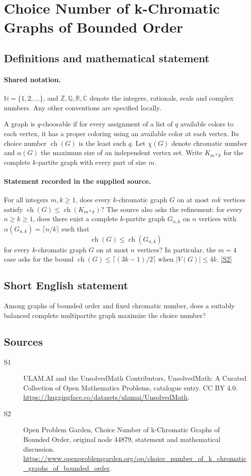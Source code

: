 \documentclass[11pt]{article}
\newcommand{\sref}[2]{\hyperlink{source:#1:#2}{[S#2]}}
\begin{document}
\section{Choice Number of k-Chromatic Graphs of Bounded Order}\label{statement}

\subsection{Definitions and mathematical statement}

\paragraph{Shared notation.}$\mathbb N=\{1,2,\ldots\}$, and $\mathbb Z,\mathbb Q,\mathbb R,\mathbb C$ denote the integers, rationals, reals and complex numbers. Any other conventions are specified locally.


A graph is $q$-choosable if for every assignment of a list of $q$ available colors to each vertex, it has a proper coloring using an available color at each vertex. Its choice number $\operatorname{ch}(G)$ is the least such $q$. Let $\chi(G)$ denote chromatic number and $\alpha(G)$ the maximum size of an independent vertex set. Write $K_{m*k}$ for the complete $k$-partite graph with every part of size $m$.
\paragraph{Statement recorded in the supplied source.}
For all integers $m,k\ge1$, does every $k$-chromatic graph $G$ on at most $mk$ vertices satisfy $\operatorname{ch}(G)\le\operatorname{ch}(K_{m*k})$? The source also asks the refinement: for every $n\ge k\ge1$, does there exist a complete $k$-partite graph $G_{n,k}$ on $n$ vertices with $\alpha(G_{n,k})=\lceil n/k\rceil$ such that \[\operatorname{ch}(G)\le\operatorname{ch}(G_{n,k})\] for every $k$-chromatic graph $G$ on at most $n$ vertices? In particular, the $m=4$ case asks for the bound $\operatorname{ch}(G)\le\lceil(3k-1)/2\rceil$ when $|V(G)|\le4k$. \sref{statement}{2}
\subsection{Short English statement}
Among graphs of bounded order and fixed chromatic number, does a suitably balanced complete multipartite graph maximize the choice number?
\subsection{Sources}
\begin{description}
\item[\hypertarget{source:statement:1}{S1}] ULAM.AI and the UnsolvedMath Contributors, UnsolvedMath: A Curated Collection of Open Mathematics Problems, catalogue entry. CC BY 4.0. \url{https://huggingface.co/datasets/ulamai/UnsolvedMath}.
\item[\hypertarget{source:statement:2}{S2}] Open Problem Garden, Choice Number of k-Chromatic Graphs of Bounded Order, original node 44879, statement and mathematical discussion. \url{https://www.openproblemgarden.org/op/choice_number_of_k_chromatic_graphs_of_bounded_order}.
\end{description}
\label{end:statement}
\end{document}
